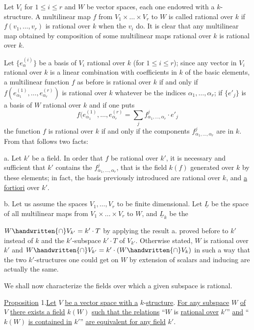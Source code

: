 Let $V_i$ for $1\leq i\leq r$ and $W$ be vector spaces, each one endowed with a $k$-structure. A multilinear map $f$ from $V_1\times\ldots\times V_r$ to $W$ is called rational over $k$ if $f(v_1,\ldots,v_r)$ is rational over $k$ when the $v_i$ do. It is clear that any multilinear map obtained by composition of some multilinear maps rational over $k$ is rational over $k$.

Let $\{e_\alpha^{(i)}\}$ be a basis of $V_i$ rational over $k$ (for $1\leq i\leq r$); since any vector in $V_i$ rational over $k$ is a linear combination with coefficients in $k$ of the basic elements, a multilinear function $f$ as before is rational over $k$ if and only if $f(e_{\alpha_1}^{(1)},\ldots,e_{\alpha_r}^{(r)})$ is rational over $k$ whatever be the indices $\alpha_1,\ldots,\alpha_r$; if $\{e'_j\}$ is a basis of $W$ rational over $k$ and if one puts
\[
f(e_{\alpha_1}^{(1)},\ldots,e_{\alpha_r}^{(r)}=\sum_j f^j_{\alpha_1,\ldots,\alpha_r}\cdot e'_j
\tag*{(4)}
\]
the function $f$ is rational over $k$ if and only if the components $f^j_{\alpha_1,\ldots,\alpha_r}$ are in $k$. From that follows two facts:

a. Let $k'$ be a field. In order that $f$ be rational over $k'$, it is necessary and sufficient that $k'$ contains the $f^j_{\alpha_1,\ldots,\alpha_r}$, that is the field $k(f)$ generated over $k$ by these elements; in fact, the basis previously introduced are rational over $k$, and \uline{a fortiori} over $k'$.

b. Let us assume the spaces $V_1,\ldots,V_r$ to be finite dimensional. Let $\underline{L}$ be the space of all multilinear maps from $V_1\times\ldots\times V_r$ to $W$, and $\underline{L}_k$ be the

\margin{\handwritten{\unsure{!}}}


$W\handwritten{\cap}V_{k'}=k'\cdot T$ by applying the result a. proved before to $k'$ instead of $k$ and the $k'$-subspace $k'\cdot T$ of $V_{k'}$. Otherwise stated, $W$ is rational over $k'$ and $W\handwritten{\cap}V_{k'}=k'\cdot(W\handwritten{\cap}V_k)$ in such a way that the two $k'$-structures one could get on $W$ by extension of scalars and inducing are actually the same.

We shall now characterize the fields over which a given subspace is rational.

\uline{Proposition} 1.\quad \uline{Let} $V$ \uline{be a vector space with a} $k$-\uline{structure}. \uline{For any subspace} $W$ \uline{of} $V$ \uline{there exists a field} $k(W)$ \uline{such that the relations} ``$W$ is \uline{rational over} $k'$'' \uline{and} ``$k(W)$ \uline{is contained in} $k'$'' \uline{are equivalent for any field} $k'$.

